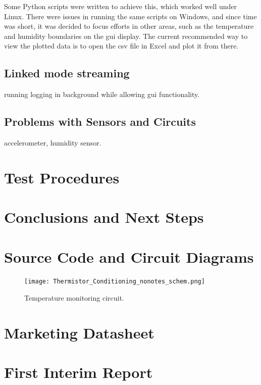 \documentclass[a4paper,10pt]{article}  %
\begin{document}
Some Python scripts were written to achieve this, which worked well
under Linux. There were issues in running the same scripts on Windows,
and since time was short, it was decided to focus efforts in other
areas, such as the temperature and humidity boundaries on the gui
display. The current recommended way to view the plotted data is to
open the csv file in Excel and plot it from there.

\subsection{Linked mode streaming}



running logging in background while allowing gui functionality.

\subsection{Problems with Sensors and Circuits}
accelerometer, humidity sensor.

\section{Test Procedures}
\label{sec:test-procedures}

\section{Conclusions and Next Steps}
\label{sec:concl-next-steps}

\FloatBarrier
\appendix

\section{Source Code and Circuit Diagrams}
\label{sec:source-code-circuit}

\begin{figure}[h]
  \begin{center}
    \texttt{[image: Thermistor\_Conditioning\_nonotes\_schem.png]}
  \end{center}
  \caption{Temperature monitoring circuit.}
  \label{fig:tempcct}
\end{figure}

\FloatBarrier

\section{Marketing Datasheet}
\label{sec:marketing-datasheet}

\section{First Interim Report}
\label{sec:first-interim-report}



\end{document}
